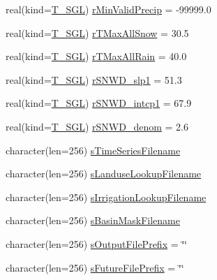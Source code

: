 \begin{DoxyCompactItemize}
\item 
real(kind=\hyperlink{namespacetest_a04d8b9090502de3a00046fe904bc3d99}{T\_\-SGL}) \hyperlink{typetest_1_1_t___m_o_d_e_l___c_o_n_f_i_g_u_r_a_t_i_o_n_a1a8c09cbbcf4059725fdcbda0ace56d9}{rMinValidPrecip} = -\/99999.0
\item 
real(kind=\hyperlink{namespacetest_a04d8b9090502de3a00046fe904bc3d99}{T\_\-SGL}) \hyperlink{typetest_1_1_t___m_o_d_e_l___c_o_n_f_i_g_u_r_a_t_i_o_n_a991e214068dc969196b4cd5bd51f29b4}{rTMaxAllSnow} = 30.5
\item 
real(kind=\hyperlink{namespacetest_a04d8b9090502de3a00046fe904bc3d99}{T\_\-SGL}) \hyperlink{typetest_1_1_t___m_o_d_e_l___c_o_n_f_i_g_u_r_a_t_i_o_n_a4e479ef5ead0f22df7bb6b6e131a71f8}{rTMaxAllRain} = 40.0
\item 
real(kind=\hyperlink{namespacetest_a04d8b9090502de3a00046fe904bc3d99}{T\_\-SGL}) \hyperlink{typetest_1_1_t___m_o_d_e_l___c_o_n_f_i_g_u_r_a_t_i_o_n_a7cafed9b61b82ca974bda6ad565d632d}{rSNWD\_\-slp1} = 51.3
\item 
real(kind=\hyperlink{namespacetest_a04d8b9090502de3a00046fe904bc3d99}{T\_\-SGL}) \hyperlink{typetest_1_1_t___m_o_d_e_l___c_o_n_f_i_g_u_r_a_t_i_o_n_a5c3a99eb4e409f00ba7874a60b219d1f}{rSNWD\_\-intcp1} = 67.9
\item 
real(kind=\hyperlink{namespacetest_a04d8b9090502de3a00046fe904bc3d99}{T\_\-SGL}) \hyperlink{typetest_1_1_t___m_o_d_e_l___c_o_n_f_i_g_u_r_a_t_i_o_n_a00628b420041af8bfe792df855c27868}{rSNWD\_\-denom} = 2.6
\item 
character(len=256) \hyperlink{typetest_1_1_t___m_o_d_e_l___c_o_n_f_i_g_u_r_a_t_i_o_n_aea73cbfb45e7d00c4feba6ae77418c97}{sTimeSeriesFilename}
\item 
character(len=256) \hyperlink{typetest_1_1_t___m_o_d_e_l___c_o_n_f_i_g_u_r_a_t_i_o_n_a096fcb7fb4959d235d9ba5604a801f11}{sLanduseLookupFilename}
\item 
character(len=256) \hyperlink{typetest_1_1_t___m_o_d_e_l___c_o_n_f_i_g_u_r_a_t_i_o_n_ac694ad51e6902afa2e429e451cf83189}{sIrrigationLookupFilename}
\item 
character(len=256) \hyperlink{typetest_1_1_t___m_o_d_e_l___c_o_n_f_i_g_u_r_a_t_i_o_n_a407a491984488e1ee33175a364fea0e8}{sBasinMaskFilename}
\item 
character(len=256) \hyperlink{typetest_1_1_t___m_o_d_e_l___c_o_n_f_i_g_u_r_a_t_i_o_n_afea527ccbaadac205528a889e66778a9}{sOutputFilePrefix} = \char`\"{}\char`\"{}
\item 
character(len=256) \hyperlink{typetest_1_1_t___m_o_d_e_l___c_o_n_f_i_g_u_r_a_t_i_o_n_ac9a65598978a4ab47a8f63352a18514a}{sFutureFilePrefix} = \char`\"{}\char`\"{}

\end{DoxyCompactItemize}
